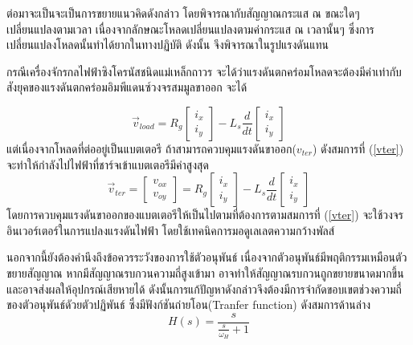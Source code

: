 \documentclass[11pt,a4paper]{article}
\begin{document}
ต่อมาจะเป็นจะเป็นการขยายแนวคิดดังกล่าว โดยพิจารณากับสัญญาณกระแส ณ ขณะใดๆ เปลี่ยนแปลงตามเวลา 
เนื่องจากลักษณะโหลดเปลี่ยนแปลงตามค่ากระแส ณ เวลานั้นๆ ซึ่งการเปลี่ยนแปลงโหลดนั้นทำได้ยากในทางปฏิบัติ ดังนั้น
จึงพิจารณาในรูปแรงดันแทน 

กรณีเครื่องจักรกลไฟฟ้าซิงโครนัสชนิดแม่เหล็กถาวร จะได้ว่าแรงดันตกคร่อมโหลดจะต้องมีค่าเท่ากับสังยุคของแรงดันตกคร่อมอิมพีแดนซ์วงจรสมมูลขาออก จะได้

\begin{equation}
    \vec{v}_{load}  = R_{g}
    \begin{bmatrix}
        i_{x} \\i_{y}
    \end{bmatrix} - L_{s}\frac{d}{dt}
    \begin{bmatrix}
        i_{x} \\i_{y}
    \end{bmatrix}
\end{equation}
แต่เนื่องจากโหลดที่ต่ออยู่เป็นแบตเตอรี ถ้าสามารถควบคุมแรงดันขาออก($v_{ter}$) ดังสมการที่ (\ref{vter}) จะทำให้กำลังไปไฟฟ้าที่ชาร์จเข้าแบตเตอรีมีค่าสูงสุด
\begin{equation}\label{vter}
    \vec{v}_{ter} =
    \begin{bmatrix}
        v_{ox} \\v_{oy}
    \end{bmatrix} = R_{g}
    \begin{bmatrix}
        i_{x} \\i_{y}
    \end{bmatrix} - L_{s}\frac{d}{dt}
    \begin{bmatrix}
        i_{x} \\i_{y}
    \end{bmatrix}
\end{equation}
โดยการควบคุมแรงดันขาออกของแบตเตอรีให้เป็นไปตามที่ต้องการตามสมการที่ (\ref{vter}) จะใช้วงจรอินเวอร์เตอร์ในการแปลงแรงดันไฟฟ้า โดยใช้เทคนิคการมอดูเลเลตความกว้างพัลส์

นอกจากนี้ยังต้องคำนึงถึงข้อควรระวังของการใช้ตัวอนุพันธ์ เนื่องจากตัวอนุพันธ์มีพฤติกรรมเหมือนตัวขยายสัญญาณ
หากมีสัญญาณรบกวนความถี่สูงเข้ามา อาจทำให้สัญญาณรบกวนถูกขยายขนาดมากขึ้น และอาจส่งผลให้อุปกรณ์เสียหายได้ ดังนั้นการแก้ปัญหาดังกล่าวจึงต้องมีการจำกัดขอบเขตช่วงความถี่
ของตัวอนุพันธ์ดัวยตัวปฏิพันธ์ ซึ่งมีฟังก์ชันถ่ายโอน(Tranfer function) ดังสมการด้านล่าง 
\begin{equation}\label{bode1}
    H(s)  = \frac{ s }{ \frac{s}{\omega_{H}} + 1 }
\end{equation}
\end{document}
